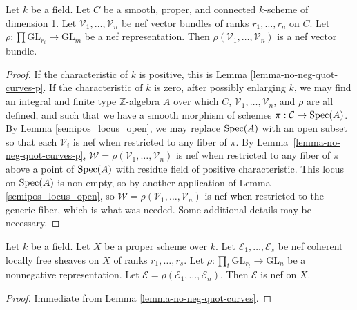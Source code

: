 \begin{lemma}\label{lemma-no-neg-quot-curves}
Let $k$ be a field.
Let $C$ be a smooth, proper, and connected $k$-scheme of dimension 1.
Let $\mathcal{V}_1,\ldots,\mathcal{V}_n$ be nef vector bundles of
ranks $r_1,\ldots,r_n$ on $C$.
Let $\rho : \prod \mathrm{GL}_{r_i} \to \mathrm{GL}_m$ be a nef
representation.
Then $\rho(\mathcal{V}_1,\ldots,\mathcal{V}_n)$ is a nef vector bundle.
\end{lemma}
\begin{proof}
If the characteristic of $k$ is positive, this is Lemma
\ref{lemma-no-neg-quot-curves-p}.
If the characteristic of $k$ is zero, after possibly enlarging $k$, we may find
an integral and finite type $\mathbb{Z}$-algebra $A$ over which $C$,
$\mathcal{V}_1,\ldots,\mathcal{V}_n$, and $\rho$ are all defined, and such that
we have a smooth morphism of schemes $\pi : \mathcal{C} \to \mathop{\rm Spec}(A)$.
By Lemma \ref{semipos_locus_open}, we may replace $\mathop{\rm Spec}(A)$ with an open
subset so that each $\mathcal{V}_i$ is nef when restricted to any
fiber of $\pi$.
By Lemma~\ref{lemma-no-neg-quot-curves-p},
$\mathcal{W} = \rho(\mathcal{V}_1,\ldots,\mathcal{V}_n)$ is nef when
restricted to any fiber of $\pi$ above a point of $\mathop{\rm Spec}(A)$ with residue field
of positive characteristic.
This locus on $\mathop{\rm Spec}(A)$ is non-empty, so by another application of Lemma
\ref{semipos_locus_open}, so
$\mathcal{W} = \rho(\mathcal{V}_1,\ldots,\mathcal{V}_n)$ is nef when
restricted to the generic fiber, which is what was needed.
Some additional details may be necessary.
\end{proof}


\begin{lemma}
\label{lemma-nonneg-rep-nef}
Let $k$ be a field.
Let $X$ be a proper scheme over $k$.
Let $\mathcal{E}_1,\ldots,\mathcal{E}_s$ be nef coherent locally free sheaves
on $X$ of ranks $r_1,\ldots,r_s$.
Let $\rho : \prod_t \mathrm{GL}_{r_t} \to \mathrm{GL}_n$ be a nonnegative
representation.
Let $\mathcal{E} = \rho(\mathcal{E}_1,\ldots,\mathcal{E}_n)$.
Then $\mathcal{E}$ is nef on $X$.
\end{lemma}

\begin{proof}
Immediate from Lemma \ref{lemma-no-neg-quot-curves}.
\end{proof}

